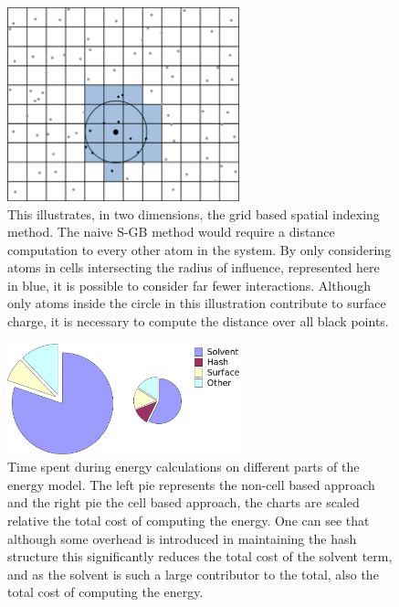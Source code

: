 \begin{figure}[h]
\begin{center}
\includegraphics[width=0.6\textwidth]{figures/grid4_crop.png}
\caption{This illustrates, in two dimensions, the grid based spatial indexing method.
The naive S-GB method would require a distance computation to every other atom in the system.
By only considering atoms in cells intersecting the radius of influence, represented here in blue, it is possible to consider far fewer interactions.
Although only atoms inside the circle in this illustration contribute to surface charge, it is necessary to compute the distance over all black points.}
\label{fig:grid_hash}
\end{center}
\end{figure}

\begin{figure}[h]
\begin{center}
\includegraphics[width=0.6\textwidth]{figures/side_by_side.png}
\caption{Time spent during energy calculations on different parts of the energy model.
The left pie represents the non-cell based approach and the right pie the cell based approach, the charts are scaled relative the total cost of computing the energy.
One can see that although some overhead is introduced in maintaining the hash structure this significantly reduces the total cost of the solvent term, and as the solvent is such a large contributor to the total, also the total cost of computing the energy.}
\label{fig:timing_pie}
\end{center}
\end{figure}
